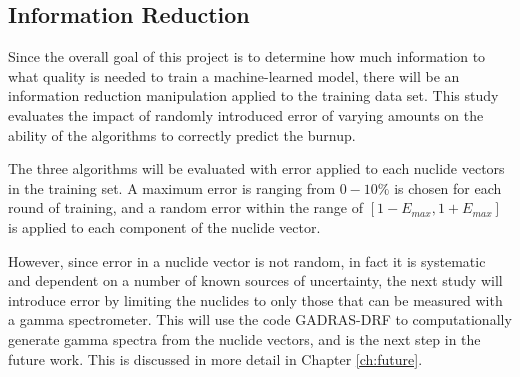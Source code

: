 \subsection{Information Reduction}
\label{sec:inforeduc}

Since the overall goal of this project is to determine how much information to
what quality is needed to train a machine-learned model, there will be an 
information reduction manipulation applied to the training data set. This study 
evaluates the impact of randomly introduced error of varying amounts on the 
ability of the algorithms to correctly predict the burnup. 

The three algorithms will be evaluated with error applied to each nuclide
vectors in the training set.  A maximum error is ranging from $0 - 10\%$ is
chosen for each round of training, and a random error within the range of
$[1-E_{max}, 1+E_{max}]$ is applied to each component of the nuclide vector.

However, since error in a nuclide vector is not random, in fact it is
systematic and dependent on a number of known sources of uncertainty, the next
study will introduce error by limiting the nuclides to only those that can be
measured with a gamma spectrometer. This will use the code \gls{GADRAS-DRF}
\cite{gadras} to computationally generate gamma spectra from the nuclide
vectors, and is the next step in the future work. This is discussed in more
detail in Chapter \ref{ch:future}.

